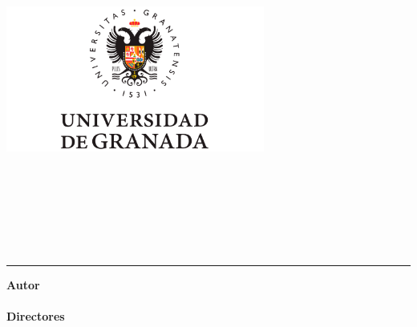 \begin{titlepage}

 


	\begin{minipage}{\textwidth}
	    \centering
	    \vspace*{-0.2cm}
		\includegraphics[width=8.5cm,height=8.5cm,keepaspectratio]{assets/images/portada/logo_ugr_new.png}

		\vspace*{1cm}
		
		
		\textsc{ \Large \capitalisewords{\tituloTrabajo} \\ [0.2cm]}
        \textsc{\titulacion} \\ [1cm]
		{\fontsize{24}{1}\selectfont{\textbf{\tituloProyecto}}}
		\vspace*{0.2cm}
	\end{minipage}



	\vspace*{0.36cm}
	\rule{150mm}{0.15mm}
	\vspace*{0.36cm}
		
		
		
	\begin{minipage}{\textwidth}
        \centering
        \vspace*{0.15cm}
        \textbf{Autor}\\ {\nombreAlumno}\\[2ex]
        \textbf{Directores}\\
        {
        \nombreTutorUno
        }\\[1cm]
        

\end{minipage}
\end{titlepage}
